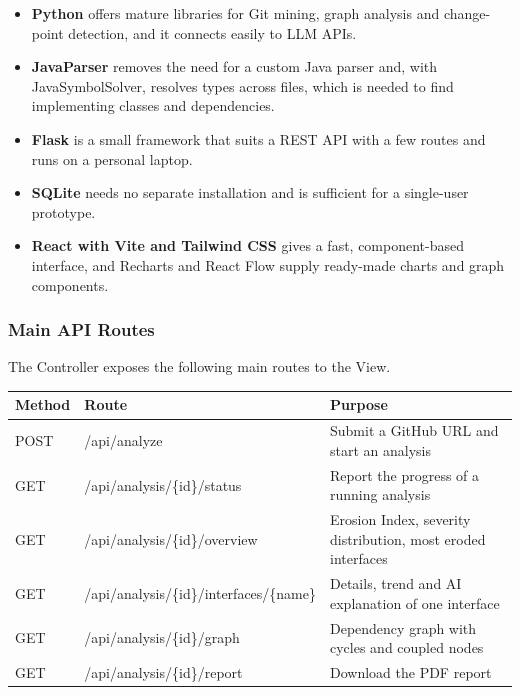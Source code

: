 \documentclass[12pt,a4paper]{article}
\begin{document}
\begin{spacing}{1.5}
\justifying
\begin{itemize}[leftmargin=*,itemsep=2pt]
  \item \textbf{Python} offers mature libraries for Git mining, graph analysis
        and change-point detection, and it connects easily to LLM APIs.
  \item \textbf{JavaParser} removes the need for a custom Java parser and, with
        JavaSymbolSolver, resolves types across files, which is needed to find
        implementing classes and dependencies.
  \item \textbf{Flask} is a small framework that suits a REST API with a few
        routes and runs on a personal laptop.
  \item \textbf{SQLite} needs no separate installation and is sufficient for
        a single-user prototype.
  \item \textbf{React with Vite and Tailwind CSS} gives a fast, component-based
        interface, and Recharts and React Flow supply ready-made charts and
        graph components.
\end{itemize}
\end{spacing}
 
\subsubsection{Main API Routes}
 
\begin{spacing}{1.5}
\justifying
The Controller exposes the following main routes to the View.
\end{spacing}
 
\begin{table}[H]
\centering
\renewcommand{\arraystretch}{1.5}
\setlength{\tabcolsep}{6pt}
 
\begin{tabular}{|L{0.7in}|L{2.35in}|L{2.3in}|}
\hline
\textbf{Method} & \textbf{Route} & \textbf{Purpose} \\
\hline
POST & /api/analyze & Submit a GitHub URL and start an analysis \\
\hline
GET & /api/analysis/\{id\}/status & Report the progress of a running analysis \\
\hline
GET & /api/analysis/\{id\}/overview & Erosion Index, severity distribution, most eroded interfaces \\
\hline
GET & /api/analysis/\{id\}/interfaces/\{name\} & Details, trend and AI explanation of one interface \\
\hline
GET & /api/analysis/\{id\}/graph & Dependency graph with cycles and coupled nodes \\
\hline
GET & /api/analysis/\{id\}/report & Download the PDF report \\
\hline
\end{tabular}
\end{table}
 
\end{document}
